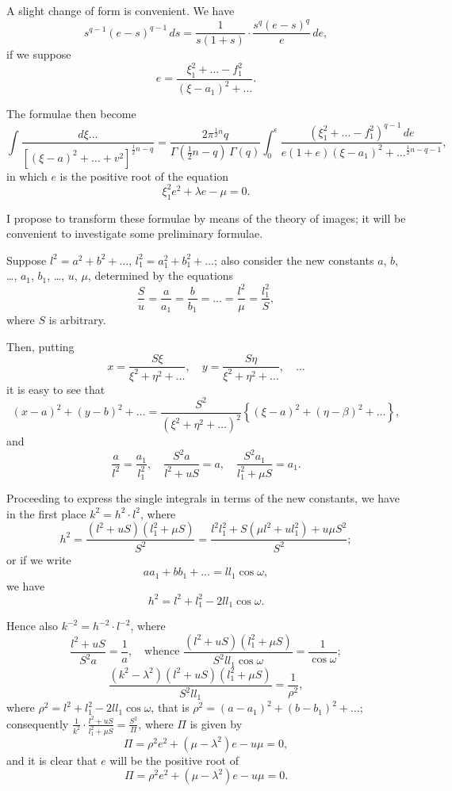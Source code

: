 \documentclass[11pt,a4paper]{article}
\theoremstyle{plain}
\begin{document}
A slight change of form is convenient. We have
\[s^{q-1}(e-s)^{q-1}\,ds = \frac{1}{s(1+s)} \cdot \frac{s^q(e-s)^q}{e}\,de,\]
if we suppose
\[e = \frac{\xi_1^2 + \ldots - f_1^2}{(\xi-a_1)^2 + \ldots}.\]

The formulae then become
\[\int \frac{d\xi \ldots}{[(\xi-a)^2 + \ldots + v^2]^{\frac{1}{2}n-q}} = \frac{2\pi^{\frac{1}{2}n}q}{\Gamma(\tfrac{1}{2}n-q)\,\Gamma(q)} \int_0^{\epsilon} \frac{(\xi_1^2 + \ldots - f_1^2)^{q-1}\,de}{e(1+e)(\xi-a_1)^2 + \ldots^{\frac{1}{2}n-q-1}},\]
in which $e$ is the positive root of the equation
\[\xi_1^2 e^2 + \lambda e - \mu = 0.\]

I propose to transform these formulae by means of the theory of images; it will be convenient to investigate some preliminary formulae.

Suppose $l^2 = a^2 + b^2 + \ldots$, $l_1^2 = a_1^2 + b_1^2 + \ldots$; also consider the new constants $a$, $b$, \ldots, $a_1$, $b_1$, \ldots, $u$, $\mu$, determined by the equations
\[\frac{S}{u} = \frac{a}{a_1} = \frac{b}{b_1} = \ldots = \frac{l^2}{\mu} = \frac{l_1^2}{S},\]
where $S$ is arbitrary.

Then, putting
\[x = \frac{S\xi}{\xi^2 + \eta^2 + \ldots}, \quad y = \frac{S\eta}{\xi^2 + \eta^2 + \ldots}, \quad \ldots\]
it is easy to see that
\[(x-a)^2 + (y-b)^2 + \ldots = \frac{S^2}{(\xi^2 + \eta^2 + \ldots)^2} \left\{ (\xi-a)^2 + (\eta-\beta)^2 + \ldots \right\},\]
and
\[\frac{a}{l^2} = \frac{a_1}{l_1^2}, \quad \frac{S^2a}{l^2 + uS} = a, \quad \frac{S^2a_1}{l_1^2 + \mu S} = a_1.\]

Proceeding to express the single integrals in terms of the new constants, we have in the first place $k^2 = h^2 \cdot l^2$, where
\[h^2 = \frac{(l^2 + uS)(l_1^2 + \mu S)}{S^2} = \frac{l^2l_1^2 + S(\mu l^2 + ul_1^2) + u\mu S^2}{S^2};\]
or if we write
\[aa_1 + bb_1 + \ldots = ll_1 \cos \omega,\]
we have
\[h^2 = l^2 + l_1^2 - 2ll_1 \cos \omega.\]

Hence also $k^{-2} = h^{-2} \cdot l^{-2}$, where
\[\frac{l^2 + uS}{S^2a} = \frac{1}{a}, \quad \text{whence } \frac{(l^2+uS)(l_1^2+\mu S)}{S^2ll_1 \cos \omega} = \frac{1}{\cos \omega};\]
\[\frac{(k^2-\lambda^2)(l^2+uS)(l_1^2+\mu S)}{S^2ll_1} = \frac{1}{\rho^2},\]
where $\rho^2 = l^2 + l_1^2 - 2ll_1 \cos \omega$, that is $\rho^2 = (a-a_1)^2 + (b-b_1)^2 + \ldots$; consequently $\frac{1}{k^2} \cdot \frac{l^2+uS}{l_1^2+\mu S} = \frac{S^2}{\Pi}$, where $\Pi$ is given by
\[\Pi = \rho^2 e^2 + (\mu - \lambda^2)e - u\mu = 0,\]
and it is clear that $e$ will be the positive root of
\[\Pi = \rho^2 e^2 + (\mu - \lambda^2)e - u\mu = 0.\]
\end{document}
